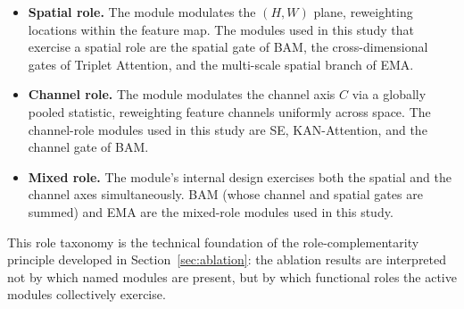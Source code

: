 \begin{itemize}
  \item \textbf{Spatial role.} The module modulates the $(H, W)$ plane,
  reweighting locations within the feature map. The modules used in this study
  that exercise a spatial role are the spatial gate of BAM, the
  cross-dimensional gates of Triplet Attention, and the multi-scale spatial
  branch of EMA.
  \item \textbf{Channel role.} The module modulates the channel axis $C$ via a
  globally pooled statistic, reweighting feature channels uniformly across
  space. The channel-role modules used in this study are SE, KAN-Attention,
  and the channel gate of BAM.
  \item \textbf{Mixed role.} The module's internal design exercises both the
  spatial and the channel axes simultaneously. BAM (whose channel and spatial
  gates are summed) and EMA are the mixed-role modules used in this study.
\end{itemize}

This role taxonomy is the technical foundation of the role-complementarity
principle developed in Section~\ref{sec:ablation}: the ablation results are
interpreted not by which named modules are present, but by which functional
roles the active modules collectively exercise.
